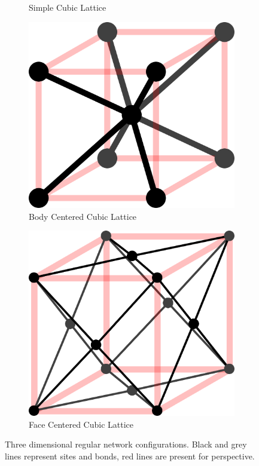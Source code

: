 \begin{figure}[p]
\begin{subfigure}[b]{0.45\textwidth}
    \caption{Simple Cubic Lattice}
    \label{fig:simple cubic lattice}
  \end{subfigure}
  \hfill
  \begin{subfigure}[b]{0.45\textwidth}
    \centering
    \includegraphics[width=\textwidth]{2/bcc}
    \caption{Body Centered Cubic Lattice}
    \label{fig:body centered cubic lattice}
  \end{subfigure}
  \hfill
  \begin{subfigure}[b]{0.45\textwidth}
    \centering
    \includegraphics[width=\textwidth]{2/fcc}
    \caption{Face Centered Cubic Lattice}
    \label{fig:face centered cubic lattice}
  \end{subfigure}
  \caption{Three dimensional regular network configurations. Black and grey lines represent sites and bonds, red lines are present for perspective.}
  \label{fig:three dimensional networks}
\end{figure}
